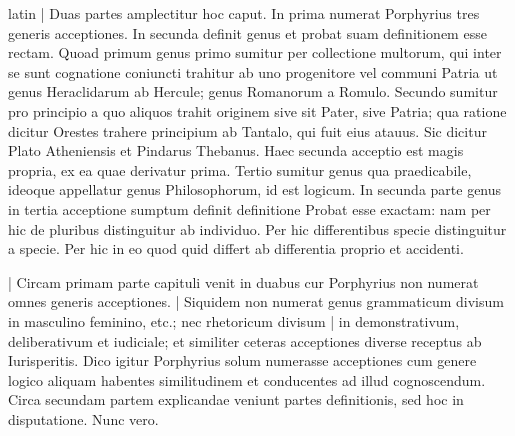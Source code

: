 \begin{otherlanguage*}{latin}
\pstart
\noindent%
  \textnormal{|} Duas partes amplectitur hoc caput. In prima numerat Porphyrius tres generis acceptiones. In secunda definit genus et probat suam definitionem esse rectam. Quoad primum genus primo sumitur per collectione multorum, qui inter se sunt cognatione coniuncti trahitur ab uno progenitore vel communi Patria ut genus Heraclidarum ab Hercule; genus Romanorum a Romulo. Secundo sumitur pro principio a quo aliquos trahit originem sive sit Pater, sive Patria; qua ratione dicitur Orestes trahere principium ab Tantalo, qui fuit eius atauus. Sic dicitur Plato Atheniensis et Pindarus Thebanus. Haec secunda acceptio est magis propria, ex ea quae derivatur prima. Tertio sumitur genus qua praedicabile, ideoque appellatur genus Philosophorum, id est logicum. In secunda parte genus in tertia acceptione sumptum definit definitione  Probat esse exactam: nam per hic de pluribus distinguitur ab individuo. Per hic differentibus specie distinguitur a specie. Per hic in eo quod quid differt ab differentia proprio et accidenti. 
\pend

        \pstart
        \pend
      
\pstart
\noindent%
  \textnormal{|} Circam primam parte capituli venit in duabus cur Porphyrius non numerat omnes generis acceptiones. \textnormal{|} Siquidem non numerat genus grammaticum divisum in masculino feminino, etc.; nec rhetoricum divisum \textnormal{|}   in demonstrativum, deliberativum et iudiciale; et similiter ceteras acceptiones diverse receptus ab Iurisperitis. Dico igitur Porphyrius solum numerasse acceptiones cum genere logico aliquam habentes similitudinem et conducentes ad illud cognoscendum. Circa secundam partem explicandae veniunt partes definitionis, sed hoc in disputatione. Nunc vero. 
\pend

        \pstart
        \pend
      

\end{otherlanguage*}
